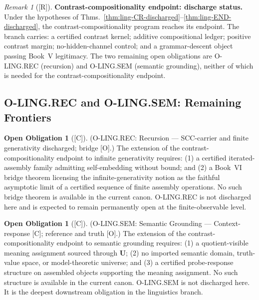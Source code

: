 \documentclass[12pt,oneside]{amsbook}
\theoremstyle{plain}
\theoremstyle{definition}
\newtheorem{obligation}[theorem]{Open Obligation}
\theoremstyle{remark}
\newtheorem{remark}[theorem]{Remark}
\newcommand{\status}[1]{\textup{[#1]}}
\begin{document}
\begin{remark}[\status{R}]\label{rem:ling-contrast-comp-complete}
\textbf{Contrast-compositionality endpoint: discharge status.}
Under the hypotheses of
Thms.~\ref{thm:ling-CR-discharged}--\ref{thm:ling-END-discharged},
the contrast-compositionality program reaches its endpoint. The
branch carries: a certified contrast kernel; additive compositional
ledger; positive contrast margin; no-hidden-channel control; and a
grammar-descent object passing Book~V legitimacy. The two remaining
open obligations are O-LING.REC (recursion) and O-LING.SEM (semantic
grounding), neither of which is needed for the
contrast-compositionality endpoint.
\end{remark}

\subsection{O-LING.REC and O-LING.SEM: Remaining Frontiers}
\label{sec:ling-frontiers}

\begin{obligation}[\status{C}]\label{ob:ling-REC-open}
\textup{(O-LING.REC: Recursion --- SCC-carrier and finite generativity discharged; bridge [O].)}
The extension of the contrast-compositionality endpoint to infinite
generativity requires: (1) a certified iterated-assembly family
admitting self-embedding without bound; and (2) a Book~VI bridge
theorem licensing the infinite-generativity notion as the
faithful asymptotic limit of a certified sequence of finite assembly
operations. No such bridge theorem is available in the current
canon. O-LING.REC is not discharged here and is expected to remain
permanently open at the finite-observable level.
\end{obligation}

\begin{obligation}[\status{C}]\label{ob:ling-SEM-open}
\textup{(O-LING.SEM: Semantic Grounding --- Context-response [C]; reference and truth [O].)}
The extension of the contrast-compositionality endpoint to semantic
grounding requires: (1) a quotient-visible meaning assignment sourced
through $\mathbf{U}$; (2) no imported semantic domain, truth-value
space, or model-theoretic universe; and (3) a certified probe-response
structure on assembled objects supporting the meaning assignment.
No such structure is available in the current canon. O-LING.SEM is
not discharged here. It is the deepest downstream obligation in the
linguistics branch.
\end{obligation}
\end{document}
